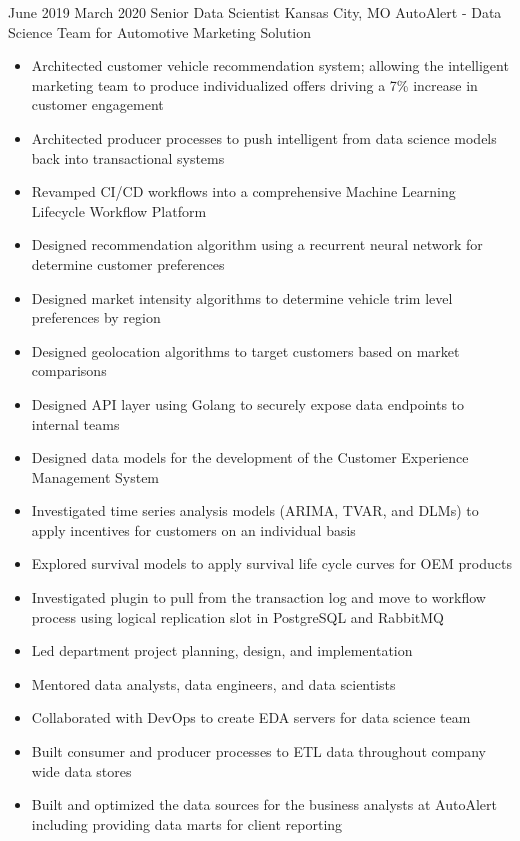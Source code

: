 \ProjectExperience
{June 2019}
{March 2020}
{Senior Data Scientist}
{Kansas City, MO}
{AutoAlert - Data Science Team for Automotive Marketing Solution}
{
    \begin{itemize}
        \item Architected customer vehicle recommendation system; allowing the
        intelligent marketing team to produce individualized offers driving a
        7\% increase in customer engagement
        \item Architected producer processes to push intelligent from data
        science models back into transactional systems
        \item Revamped CI/CD workflows into a comprehensive Machine Learning
        Lifecycle Workflow Platform
    \end{itemize}
}
{
    \begin{itemize}
        \item Designed recommendation algorithm using a recurrent neural network
        for determine customer preferences
        \item Designed market intensity algorithms to determine vehicle trim
        level preferences by region
        \item Designed geolocation algorithms to target customers based on
        market comparisons
        \item Designed API layer using Golang to securely expose data endpoints
        to internal teams
        \item Designed data models for the development of the Customer
        Experience Management System
        \item Investigated time series analysis models (ARIMA, TVAR, and DLMs)
        to apply incentives for customers on an individual basis
        \item Explored survival models to apply survival life cycle curves for
        OEM products
        \item Investigated plugin to pull from the transaction log and move to
        workflow process using logical replication slot in PostgreSQL and
        RabbitMQ
    \end{itemize}
}
{
    \begin{itemize}
        \item Led department project planning, design, and implementation
        \item Mentored data analysts, data engineers, and data scientists
        \item Collaborated with DevOps to create EDA servers for data science
        team
        \item Built consumer and producer processes to ETL data throughout
        company wide data stores
        \item Built and optimized the data sources for the business analysts at
        AutoAlert including providing data marts for client reporting
    \end{itemize}
}

